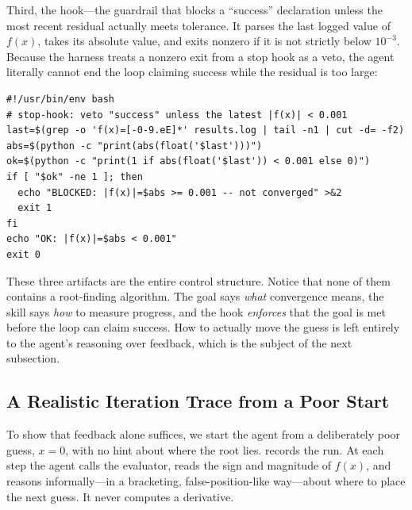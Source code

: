 Third, the hook---the guardrail that blocks a ``success'' declaration unless the
most recent residual actually meets tolerance. It parses the last logged value of
$f(x)$, takes its absolute value, and exits nonzero if it is not strictly below
$10^{-3}$. Because the harness treats a nonzero exit from a stop hook as a veto,
the agent literally cannot end the loop claiming success while the residual is too
large:

\begin{verbatim}
#!/usr/bin/env bash
# stop-hook: veto "success" unless the latest |f(x)| < 0.001
last=$(grep -o 'f(x)=[-0-9.eE]*' results.log | tail -n1 | cut -d= -f2)
abs=$(python -c "print(abs(float('$last')))")
ok=$(python -c "print(1 if abs(float('$last')) < 0.001 else 0)")
if [ "$ok" -ne 1 ]; then
  echo "BLOCKED: |f(x)|=$abs >= 0.001 -- not converged" >&2
  exit 1
fi
echo "OK: |f(x)|=$abs < 0.001"
exit 0
\end{verbatim}

These three artifacts are the entire control structure. Notice that none of them
contains a root-finding algorithm. The goal says \emph{what} convergence means,
the skill says \emph{how} to measure progress, and the hook \emph{enforces} that
the goal is met before the loop can claim success. How to actually move the guess
is left entirely to the agent's reasoning over feedback, which is the subject of
the next subsection.

\subsection{A Realistic Iteration Trace from a Poor Start}\label{subsec:rootfind-trace}

To show that feedback alone suffices, we start the agent from a deliberately poor
guess, $x=0$, with no hint about where the root lies. 
records the run. At each step the agent calls the evaluator, reads the sign and
magnitude of $f(x)$, and reasons informally---in a bracketing,
false-position-like way---about where to place the next guess. It never computes a
derivative.

